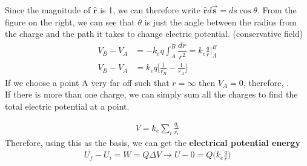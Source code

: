 \documentclass[12pt, titlepage, oneside]{article}
\let\oldhat\hat
\let\oldvec\vec
\renewcommand{\hat}[1]{\oldhat{\mathbf{#1}}}
\renewcommand{\vec}[1]{\oldvec{\bm{#1}}}
\renewcommand{\hat}[1]{\oldhat{\bm{#1}}}
\begin{document}
Since the magnitude of $\hat{r}$ is 1, we can therefore write $\hat{r} d \vec{s} = ds \cos\theta$. From the figure on the right, we can see that $\theta$ is just the angle between the radius from the charge and the path it takes to change electric potential. (conservative field)
\begin{align*}
V_B - V_A &= - k_e q \int_A^B \dfrac{dr}{r^2} = k_e \frac{q}{r} \Big|_A^B\\
V_B - V_A &= k_e q \Bigg[\frac{1}{r_B}-\frac{1}{r_A}\Bigg]
\end{align*}
If we choose a point A very far off such that $ r=\infty$ then $V_A = 0$, therefore,
\newpage
\noindent{}.
\\

\noindent If there is more than one charge, we can simply sum all the charges to find the total electric potential at a point.

\begin{align*}
V = k_e \sum_i \frac {q_i}{r_i}
\end{align*}
Therefore, using this as the basis, we can get the \textbf{electrical potential energy}
\begin{align*}
U_f - U_i = W = Q\Delta V \rightarrow U - 0 = Q\Bigg(k_e\frac{q}{r}\Bigg)
\end{align*}
\noindent{}	\\
\end{document}
